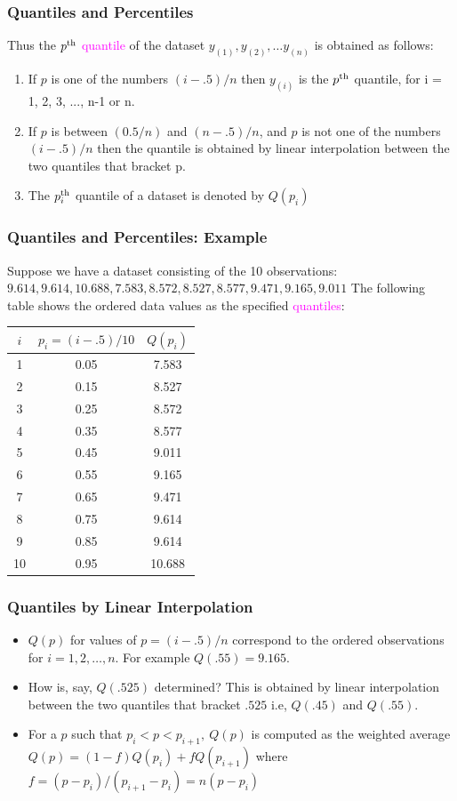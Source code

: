 \documentclass[xcolor=dvipsnames,12pt]{beamer}
\begin{document}
\begin{frame}
\frametitle{Quantiles and Percentiles}
Thus the  $p^{\rm th}$  \textcolor{magenta}{quantile} 
of the  dataset $y_{(1)}, y_{(2)}, \ldots y_{(n)}$ is obtained as follows:
\begin{enumerate}
\item If $p$ is one of the numbers $(i-.5)/n$ then $y_{(i)}$ is the 
$p^{\rm th}$ quantile, for i = 1, 2, 3, ..., n-1 or n.
\item  If $p$ is between $(0.5/n)$ and $(n-.5)/n$, and $p$ is not
one of the numbers $(i-.5)/n$ then the quantile is obtained 
by linear interpolation between the two quantiles that bracket p.
\item The $p_i^{\rm th}$ quantile of a dataset is denoted by $Q(p_i)$
\end{enumerate}
\end{frame}


\begin{frame}
\frametitle{Quantiles and Percentiles: Example}
Suppose we have a dataset consisting of the 10 observations:
$9.614,  9.614,  10.688,  7.583,  8.572,  8.527,  8.577,  9.471,
9.165,  9.011$ The following table shows the ordered data values as
the specified \textcolor{magenta}{quantiles}:
{\footnotesize
\begin{center}
\begin{tabular}{|c|c|c|} \hline
 \multicolumn{1}{|c|}{$i$} &\multicolumn{1}{c|}{$p_i=(i-.5)/10$} &
\multicolumn{1}{c|}{$Q(p_i)$} 
                 \\ \hline
 1 & 0.05 & 7.583\\
 2 & 0.15&   8.527\\
 3 & 0.25 &  8.572 \\
 4 & 0.35 &  8.577  \\
 5 & 0.45 &  9.011\\
 6 & 0.55 &  9.165\\
 7 & 0.65 &   9.471 \\
 8 & 0.75 &    9.614 \\
 9 & 0.85 &  9.614  \\ 
 10 & 0.95 &  10.688\\ \hline
\end{tabular}
\end{center}}
\end{frame}



\begin{frame}
\frametitle{Quantiles by Linear Interpolation}
\begin{itemize}
\item $Q(p)$ for values of $p = (i-.5)/n$ correspond to
the ordered observations for $i = 1, 2, \ldots, n$. For example 
$Q(.55)=9.165$. 
\item How is, say, $Q(.525)$ determined? This is obtained by
linear interpolation between the two quantiles that bracket $.525$
i.e, $Q(.45)$ and $Q(.55)$.
\item For a $p$ such that $p_i < p < p_{i+1},\ Q(p)$ is computed as 
the weighted average $Q(p) = (1-f)Q(p_i) + fQ(p_{i+1})$ where 
$f =(p-p_i)/(p_{i+1}-p_i) = n(p-p_i)$
\end{itemize}
\end{frame}
\end{document}
